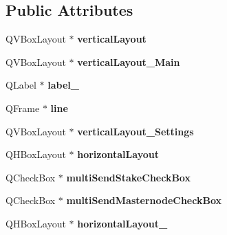 \subsection*{Public Attributes}
\begin{DoxyCompactItemize}
\item 
\mbox{\label{class_ui___multi_send_dialog_af56bdd528c06c6e6d3d59a986fcd03e5}} 
Q\+V\+Box\+Layout $\ast$ {\bfseries vertical\+Layout}
\item 
\mbox{\label{class_ui___multi_send_dialog_a0dc0d63c8ba05a867cee4a8678406baa}} 
Q\+V\+Box\+Layout $\ast$ {\bfseries vertical\+Layout\+\_\+\+Main}
\item 
\mbox{\label{class_ui___multi_send_dialog_ade770a46894c28ad4caca9e8a5206d82}} 
Q\+Label $\ast$ {\bfseries label\+\_}
\item 
\mbox{\label{class_ui___multi_send_dialog_af701bc92383c807c62e95c8fa34d60af}} 
Q\+Frame $\ast$ {\bfseries line}
\item 
\mbox{\label{class_ui___multi_send_dialog_a7fa1f10ff0b5c197d285833761dd2598}} 
Q\+V\+Box\+Layout $\ast$ {\bfseries vertical\+Layout\+\_\+\+Settings}
\item 
\mbox{\label{class_ui___multi_send_dialog_a79c21b8f851445521dab9e5d846a5f0e}} 
Q\+H\+Box\+Layout $\ast$ {\bfseries horizontal\+Layout}
\item 
\mbox{\label{class_ui___multi_send_dialog_ae18a13e6905654e1a6a8770ee7ef5f9a}} 
Q\+Check\+Box $\ast$ {\bfseries multi\+Send\+Stake\+Check\+Box}
\item 
\mbox{\label{class_ui___multi_send_dialog_a2c1fcb2be8543ed5e22aee1cb6a8d5cf}} 
Q\+Check\+Box $\ast$ {\bfseries multi\+Send\+Masternode\+Check\+Box}
\item 
\mbox{\label{class_ui___multi_send_dialog_aa2085405cb94f3ba8c179412f76e9cfb}} 
Q\+H\+Box\+Layout $\ast$ {\bfseries horizontal\+Layout\+\_}
\item 

\end{DoxyCompactItemize}

